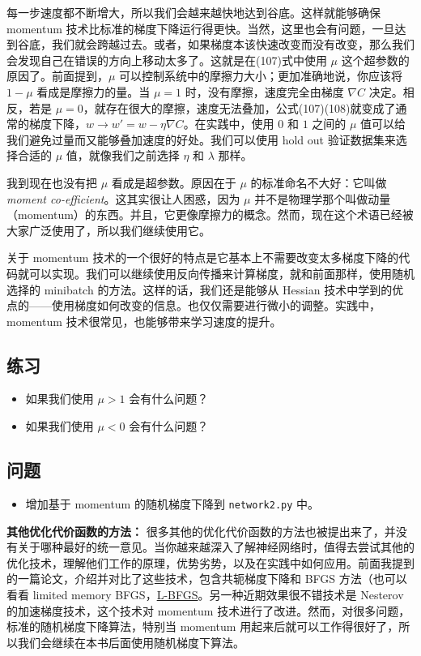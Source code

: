 每一步速度都不断增大，所以我们会越来越快地达到谷底。这样就能够确保 momentum 技术比标准的梯度下降运行得更快。当然，这里也会有问题，一旦达到谷底，我们就会跨越过去。或者，如果梯度本该快速改变而没有改变，那么我们会发现自己在错误的方向上移动太多了。这就是在(107)式中使用 $\mu$ 这个超参数的原因了。前面提到，$\mu$ 可以控制系统中的摩擦力大小；更加准确地说，你应该将 $1-\mu$ 看成是摩擦力的量。当 $\mu=1$ 时，没有摩擦，速度完全由梯度 $\nabla C$ 决定。相反，若是 $\mu=0$，就存在很大的摩擦，速度无法叠加，公式(107)(108)就变成了通常的梯度下降，$w\rightarrow w'=w-\eta \nabla C$。在实践中，使用 $0$ 和 $1$ 之间的 $\mu$ 值可以给我们避免过量而又能够叠加速度的好处。我们可以使用 hold out 验证数据集来选择合适的 $\mu$ 值，就像我们之前选择 $\eta$ 和 $\lambda$ 那样。

我到现在也没有把 $\mu$ 看成是超参数。原因在于 $\mu$ 的标准命名不大好：它叫做\emph{moment co-efficient}。这其实很让人困惑，因为 $\mu$ 并不是物理学那个叫做动量（momentum）的东西。并且，它更像摩擦力的概念。然而，现在这个术语已经被大家广泛使用了，所以我们继续使用它。

关于 momentum 技术的一个很好的特点是它基本上不需要改变太多梯度下降的代码就可以实现。我们可以继续使用反向传播来计算梯度，就和前面那样，使用随机选择的 minibatch 的方法。这样的话，我们还是能够从 Hessian 技术中学到的优点的——使用梯度如何改变的信息。也仅仅需要进行微小的调整。实践中，momentum 技术很常见，也能够带来学习速度的提升。

\subsection*{练习}

\begin{itemize}
\item 如果我们使用 $\mu > 1$ 会有什么问题？
\item 如果我们使用 $\mu < 0$ 会有什么问题？
\end{itemize}

\subsection*{问题}

\begin{itemize}
\item 增加基于 momentum 的随机梯度下降到 \lstinline!network2.py! 中。
\end{itemize}

\textbf{其他优化代价函数的方法：} 很多其他的优化代价函数的方法也被提出来了，并没有关于哪种最好的统一意见。当你越来越深入了解神经网络时，值得去尝试其他的优化技术，理解他们工作的原理，优势劣势，以及在实践中如何应用。前面我提到的一篇论文，介绍并对比了这些技术，包含共轭梯度下降和 BFGS 方法（也可以看看 limited memory BFGS，\href{http://en.wikipedia.org/wiki/Limited-memory_BFGS}{L-BFGS}。另一种近期效果很不错技术是 Nesterov 的加速梯度技术，这个技术对 momentum 技术进行了改进。然而，对很多问题，标准的随机梯度下降算法，特别当 momentum 用起来后就可以工作得很好了，所以我们会继续在本书后面使用随机梯度下算法。

